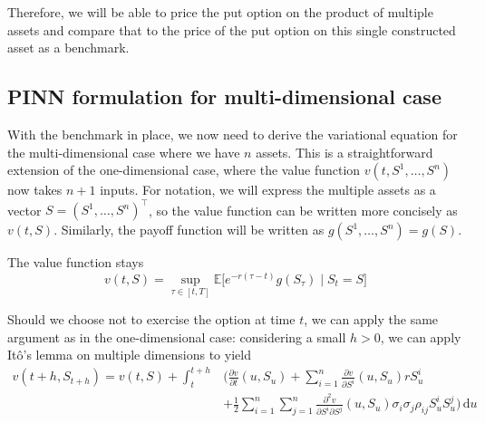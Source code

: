 Therefore, we will be able to price the put option on the product of multiple assets and compare that to the price of the put option on this single constructed asset as a benchmark.

\subsection{PINN formulation for multi-dimensional case}

With the benchmark in place, we now need to derive the variational equation for the multi-dimensional case where we have $n$ assets. This is a straightforward extension of the one-dimensional case, where the value function $v(t, S^1, \dots, S^n)$ now takes $n+1$ inputs. For notation, we will express the multiple assets as a vector $S = (S^1, \dots, S^n)^\top$, so the value function can be written more concisely as $v(t, S)$. Similarly, the payoff function will be written as $g(S^1, \dots, S^n) = g(S)$.

The value function stays
\begin{equation}
    v(t, S) = \sup_{\tau \in [t, T]} \mathbb E\big[e^{-r(\tau - t)}g(S_\tau) \mid S_t = S\big]
\end{equation}

Should we choose not to exercise the option at time $t$, we can apply the same argument as in the one-dimensional case: considering a small $h > 0$, we can apply Itô's lemma on multiple dimensions to yield
\begin{equation}
    \begin{aligned}
        v(t + h, S_{t + h}) = v(t, S) + \int_t^{t+h} &\bigg(
            \frac{\partial v}{\partial t}(u, S_u) +
            \sum_{i=1}^n \frac{\partial v}{\partial S^i}(u, S_u) rS_u^i\\
            &+ \frac 12 \sum_{i=1}^n \sum_{j=1}^n \frac{\partial^2 v}{\partial S^i \partial S^j}(u, S_u) \sigma_i \sigma_j \rho_{ij} S_u^i S_u^j
        \bigg) \,\mathrm du
    \end{aligned}
\end{equation}

